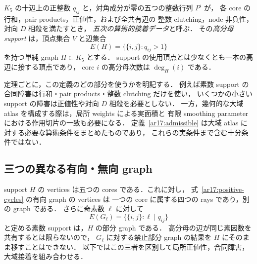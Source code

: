 \begin{definition}[五次の算術的接着データ]
\label{ar17:admissible}
$K_5$ の十辺上の正整数 $q_{ij}$ と，対角成分が零の五つの整数行列 $P^i$ が，
各 core の行和，pair products，正値性，および全共有辺の
整数 clutching，node 非負性，対向 $D$ 相殺を満たすとき，
\emph{五次の算術的接着データ}と呼ぶ．
その\emph{高分母 support} は，頂点集合 $V$ と辺集合
\begin{equation}\label{ar17:high-support}
 E(H)=\{\{i,j\}:q_{ij}>1\}
\end{equation}
を持つ単純 graph $H\subset K_5$ とする．
support の使用頂点とは少なくとも一本の高辺に接する頂点であり，
core $i$ の高分母次数は $\deg_H(i)$ である．
\end{definition}

定理ごとに，この定義のどの部分を使うかを明記する．
例えば素数 support の合同障害は行和・pair products・整数 clutching だけを使い，
いくつかの小さい support の障害は正値性や対向 $D$ 相殺を必要としない．
一方，幾何的な大域 atlas を構成する際は，局所 weights による実面積と
有限 smoothing parameter における作用切片の一致も必要になる．
定義~\ref{ar17:admissible} は大域 atlas に対する必要な算術条件をまとめたものであり，
これらの実条件まで含む十分条件ではない．

\subsection{三つの異なる有向・無向 graph}

support $H$ の vertices は五つの cores である．これに対し，
式~\eqref{ar17:positive-cycles} の有向 graph の vertices は
一つの core に属する四つの rays であり，別の graph である．
さらに奇素数 $\ell$ に対して
\[
 E(G_\ell)=\{\{i,j\}:\ell\mid q_{ij}\}
\]
と定める素数 support は，$H$ の部分 graph である．
高分母の辺が同じ素因数を共有するとは限らないので，
$G_\ell$ に対する禁止部分 graph の結果を $H$ にそのまま移すことはできない．
以下ではこの三者を区別して局所正値性，合同障害，大域接着を組み合わせる．
